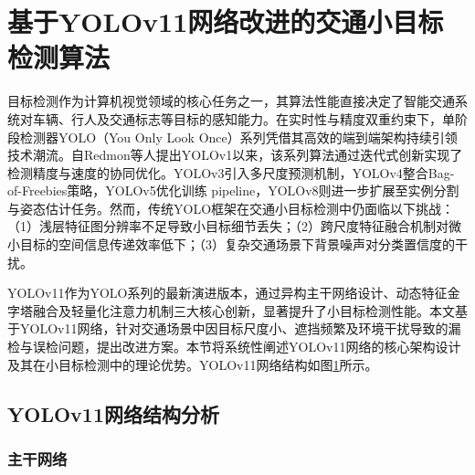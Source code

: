 \section{基于YOLOv11网络改进的交通小目标检测算法\label{方法B}}

目标检测作为计算机视觉领域的核心任务之一，其算法性能直接决定了智能交通系统对车辆、行人及交通标志等目标的感知能力。在实时性与精度双重约束下，单阶段检测器YOLO（You Only Look Once）系列凭借其高效的端到端架构持续引领技术潮流。自Redmon等人提出YOLOv1以来，该系列算法通过迭代式创新实现了检测精度与速度的协同优化。YOLOv3引入多尺度预测机制，YOLOv4整合Bag-of-Freebies策略，YOLOv5优化训练 pipeline，YOLOv8则进一步扩展至实例分割与姿态估计任务。然而，传统YOLO框架在交通小目标检测中仍面临以下挑战：（1）浅层特征图分辨率不足导致小目标细节丢失；（2）跨尺度特征融合机制对微小目标的空间信息传递效率低下；（3）复杂交通场景下背景噪声对分类置信度的干扰。

YOLOv11作为YOLO系列的最新演进版本，通过异构主干网络设计、动态特征金字塔融合及轻量化注意力机制三大核心创新，显著提升了小目标检测性能。本文基于YOLOv11网络，针对交通场景中因目标尺度小、遮挡频繁及环境干扰导致的漏检与误检问题，提出改进方案。本节将系统性阐述YOLOv11网络的核心架构设计及其在小目标检测中的理论优势。YOLOv11网络结构如图\ref{fig:YOLOv11}所示。

\subsection{YOLOv11网络结构分析}

\begin{figure}[htb]
    \centering
    \captionsetup{font=footnotesize}
    \label{fig:YOLOv11}
\end{figure}

\subsubsection{主干网络}

